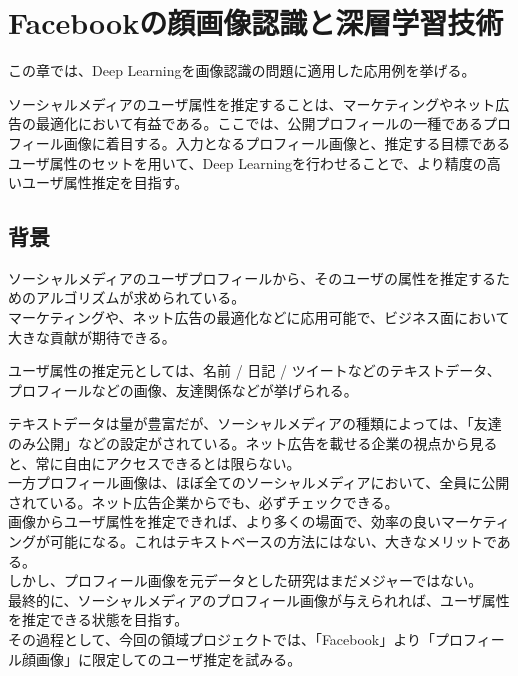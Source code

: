 \chapter{Facebookの顔画像認識と深層学習技術}
この章では、Deep Learningを画像認識の問題に適用した応用例を挙げる。\par
ソーシャルメディアのユーザ属性を推定することは、マーケティングやネット広告の最適化において有益である。ここでは、公開プロフィールの一種であるプロフィール画像に着目する。入力となるプロフィール画像と、推定する目標であるユーザ属性のセットを用いて、Deep Learningを行わせることで、より精度の高いユーザ属性推定を目指す。

\section{背景}
ソーシャルメディアのユーザプロフィールから、そのユーザの属性を推定するためのアルゴリズムが求められている。\\
マーケティングや、ネット広告の最適化などに応用可能で、ビジネス面において大きな貢献が期待できる。\par
ユーザ属性の推定元としては、名前 / 日記 / ツイートなどのテキストデータ、プロフィールなどの画像、友達関係などが挙げられる。\cite{pennacchiotti2011a-machine}

テキストデータは量が豊富だが、ソーシャルメディアの種類によっては、「友達のみ公開」などの設定がされている。ネット広告を載せる企業の視点から見ると、常に自由にアクセスできるとは限らない。\\

一方プロフィール画像は、ほぼ全てのソーシャルメディアにおいて、全員に公開されている。ネット広告企業からでも、必ずチェックできる。\\

画像からユーザ属性を推定できれば、より多くの場面で、効率の良いマーケティングが可能になる。これはテキストベースの方法にはない、大きなメリットである。\\

しかし、プロフィール画像を元データとした研究はまだメジャーではない。\\
最終的に、ソーシャルメディアのプロフィール画像が与えられれば、ユーザ属性を推定できる状態を目指す。\\
その過程として、今回の領域プロジェクトでは、「Facebook」より「プロフィール顔画像」に限定してのユーザ推定を試みる。\par

